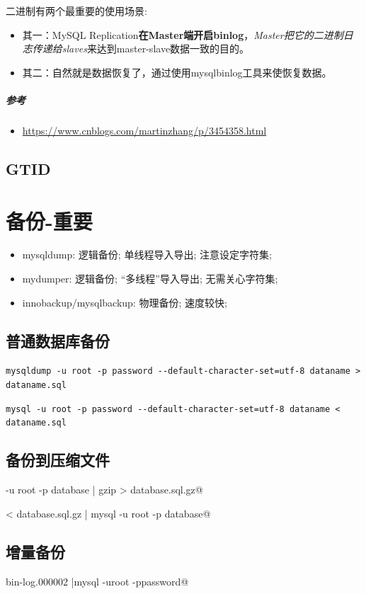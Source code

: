 \documentclass[UTF8,a4paper,12pt]{ctexbook}
\begin{document}
		二进制有两个最重要的使用场景: 
			\begin{itemize}
				\item 其一：MySQL Replication\textbf{在Master端开启binlog}，\textit{Master把它的二进制日志传递给slaves}来达到master-slave数据一致的目的。 
				\item 其二：自然就是数据恢复了，通过使用mysqlbinlog工具来使恢复数据。
			\end{itemize}    
		    
		\subparagraph{参考}
			\begin{itemize}
				\item \url{https://www.cnblogs.com/martinzhang/p/3454358.html}
			\end{itemize}
			
		\subsection{GTID}
		
	\section{备份-重要}
		\begin{itemize}
			\item mysqldump: 逻辑备份; 单线程导入导出; 注意设定字符集; 
			\item mydumper: 逻辑备份; “多线程”导入导出; 无需关心字符集;
			\item innobackup/mysqlbackup: 物理备份; 速度较快;
		\end{itemize}
		\subsection{普通数据库备份}
			\verb|mysqldump -u root -p password --default-character-set=utf-8 dataname > dataname.sql|
			
			\verb|mysql -u root -p password --default-character-set=utf-8 dataname < dataname.sql|
		\subsection{备份到压缩文件}
			\verb@mysqldump -u root -p database | gzip > database.sql.gz@
			
			\verb@gzip < database.sql.gz | mysql -u root -p database@
		\subsection{增量备份}
			\verb@mysqlbinlog bin-log.000002 |mysql -uroot -ppassword@
		
\end{document}
